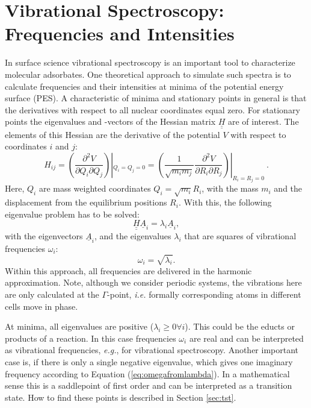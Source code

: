 \documentclass[11pt,DIV=13,BCOR=5mm,a4paper,headinclude]{scrbook}
\renewcommand{\vec}[1]{\underline{#1}}
\def\doubleunderline#1{\underline{\underline{#1}}}
\begin{document}
\section{Vibrational Spectroscopy: Frequencies and Intensities}\label{sec:freq_theo}
In surface science vibrational spectroscopy is an important tool to characterize molecular adsorbates.
One theoretical approach to simulate such spectra is to calculate frequencies and their intensities at minima of the potential energy surface (PES).
A characteristic of minima and stationary points in general is that the derivatives with respect to all nuclear coordinates equal zero.
For stationary points the eigenvalues and -vectors of the Hessian matrix $\doubleunderline{H}$ are of interest.
The elements of this Hessian are the derivative of the potential $V$ with respect to coordinates $i$ and $j$:
\begin{equation}
 H_{ij}=\left( \frac{\partial^2 V}{\partial Q_i \partial Q_j} \right)|_{Q_i=Q_j=0}=\left(\frac{1}{\sqrt{m_i m_j}} \frac{\partial^2 V}{\partial R_i \partial R_j} \right)|_{R_i=R_j=0} ~.
\end{equation}
Here, $Q_i$ are mass weighted coordinates $Q_i=\sqrt{m_i}R_i$, with the mass $m_i$ and the displacement from the equilibrium positions $R_i$.
With this, the following eigenvalue problem has to be solved:
\begin{equation}
 \doubleunderline{H} \vec{A}_i=\lambda_i\vec{A}_i,
\end{equation}
with the eigenvectors $\vec{A}_i$, and the eigenvalues $\lambda_i$ that are squares of vibrational frequencies $\omega_i$: 
\begin{equation}\label{eq:omegafromlambda}
 \omega_i=\sqrt{\lambda_i}.
\end{equation}
Within this approach, all frequencies are delivered in the harmonic approximation.
Note, although we consider periodic systems, the vibrations here are only calculated at the $\Gamma$-point, \textit{i.e.} formally corresponding atoms in different cells move in phase.


At minima, all eigenvalues are positive ($\lambda_i\geq 0 \forall i$).
This could be the educts or products of a reaction.
In this case frequencies $\omega_i$ are real and can be interpreted as vibrational frequencies, \textit{e.g.}, for vibrational spectroscopy.
Another important case is, if there is only a single negative eigenvalue, which gives one imaginary frequency according to Equation (\ref{eq:omegafromlambda}).
In a mathematical sense this is a saddlepoint of first order and can be interpreted as a transition state.
How to find these points is described in Section \ref{sec:tst}.
\\\\
\end{document}
